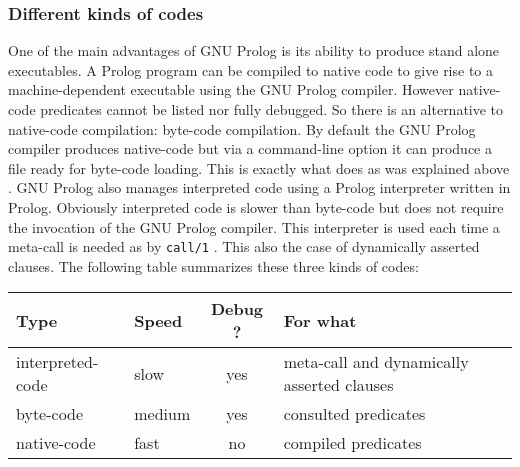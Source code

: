 \subsubsection{Different kinds of codes}
\label{Different-kinds-of-codes}
One of the main advantages of GNU Prolog is its ability to produce stand
alone executables. A Prolog program can be compiled to native code to give
rise to a machine-dependent executable using the GNU Prolog compiler. However
native-code predicates cannot be listed nor fully debugged. So there is an
alternative to native-code compilation: byte-code compilation. By default the
GNU Prolog compiler produces native-code but via a command-line option it can
produce a file ready for byte-code loading. This is exactly what
 does as was explained above . GNU Prolog also manages interpreted code using a Prolog interpreter
written in Prolog. Obviously interpreted code is slower than byte-code but
does not require the invocation of the GNU Prolog compiler. This interpreter is
used each time a meta-call is needed as by \texttt{call/1} .
This also the case of dynamically asserted clauses. The following table
summarizes these three kinds of codes:

\begin{tabular}{|l|l|c|l|}
\hline

Type & Speed & Debug ? & For what \\

\hline\hline

interpreted-code & slow & yes & meta-call and dynamically asserted clauses
\\

\hline

byte-code & medium & yes & consulted predicates \\

\hline

native-code & fast & no & compiled predicates \\

\hline
\end{tabular}

